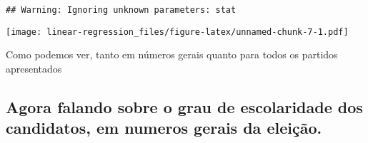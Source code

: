 \documentclass[]{article}
\newenvironment{Shaded}{\begin{snugshade}}{\end{snugshade}}
\newcommand{\KeywordTok}[1]{\textcolor[rgb]{0.13,0.29,0.53}{\textbf{#1}}}
\newcommand{\DataTypeTok}[1]{\textcolor[rgb]{0.13,0.29,0.53}{#1}}
\newcommand{\DecValTok}[1]{\textcolor[rgb]{0.00,0.00,0.81}{#1}}
\newcommand{\StringTok}[1]{\textcolor[rgb]{0.31,0.60,0.02}{#1}}
\newcommand{\OperatorTok}[1]{\textcolor[rgb]{0.81,0.36,0.00}{\textbf{#1}}}
\newcommand{\NormalTok}[1]{#1}
\begin{document}
\begin{Shaded}
\end{Shaded}

\begin{verbatim}
## Warning: Ignoring unknown parameters: stat
\end{verbatim}

\texttt{[image: linear-regression\_files/figure-latex/unnamed-chunk-7-1.pdf]}

Como podemos ver, tanto em números gerais quanto para todos os partidos
apresentados

\subsection{Agora falando sobre o grau de escolaridade dos candidatos,
em numeros gerais da
eleição.}\label{agora-falando-sobre-o-grau-de-escolaridade-dos-candidatos-em-numeros-gerais-da-eleicao.}
\end{document}
